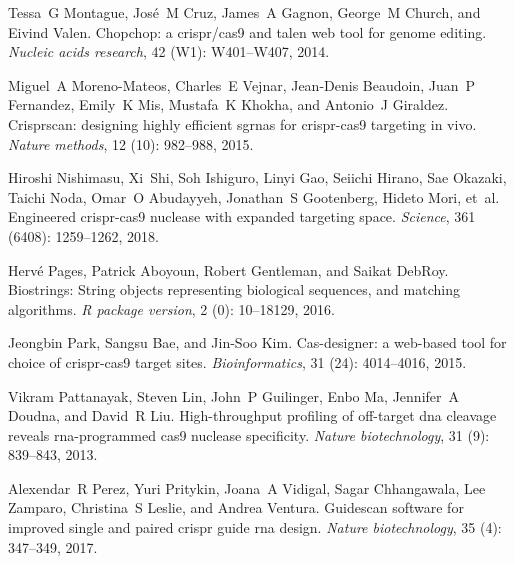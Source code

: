 \documentclass[pdftex,english,10pt]{article}
\begin{document}
{\begin{thebibliography}{105}
Tessa~G Montague, Jos{\'e}~M Cruz, James~A Gagnon, George~M Church, and Eivind
  Valen.
\newblock Chopchop: a crispr/cas9 and talen web tool for genome editing.
\newblock \emph{Nucleic acids research}, 42 (W1): W401--W407,
  2014.

Miguel~A Moreno-Mateos, Charles~E Vejnar, Jean-Denis Beaudoin, Juan~P
  Fernandez, Emily~K Mis, Mustafa~K Khokha, and Antonio~J Giraldez.
\newblock Crisprscan: designing highly efficient sgrnas for crispr-cas9
  targeting in vivo.
\newblock \emph{Nature methods}, 12 (10): 982--988, 2015.

Hiroshi Nishimasu, Xi~Shi, Soh Ishiguro, Linyi Gao, Seiichi Hirano, Sae
  Okazaki, Taichi Noda, Omar~O Abudayyeh, Jonathan~S Gootenberg, Hideto Mori,
  et~al.
\newblock Engineered crispr-cas9 nuclease with expanded targeting space.
\newblock \emph{Science}, 361 (6408): 1259--1262, 2018.

Herv{\'e} Pages, Patrick Aboyoun, Robert Gentleman, and Saikat DebRoy.
\newblock Biostrings: String objects representing biological sequences, and
  matching algorithms.
\newblock \emph{R package version}, 2 (0): 10--18129, 2016.

Jeongbin Park, Sangsu Bae, and Jin-Soo Kim.
\newblock Cas-designer: a web-based tool for choice of crispr-cas9 target
  sites.
\newblock \emph{Bioinformatics}, 31 (24): 4014--4016, 2015.

Vikram Pattanayak, Steven Lin, John~P Guilinger, Enbo Ma, Jennifer~A Doudna,
  and David~R Liu.
\newblock High-throughput profiling of off-target dna cleavage reveals
  rna-programmed cas9 nuclease specificity.
\newblock \emph{Nature biotechnology}, 31 (9): 839--843,
  2013.

Alexendar~R Perez, Yuri Pritykin, Joana~A Vidigal, Sagar Chhangawala, Lee
  Zamparo, Christina~S Leslie, and Andrea Ventura.
\newblock Guidescan software for improved single and paired crispr guide rna
  design.
\newblock \emph{Nature biotechnology}, 35 (4): 347--349,
  2017.


\end{thebibliography}}
\end{document}
